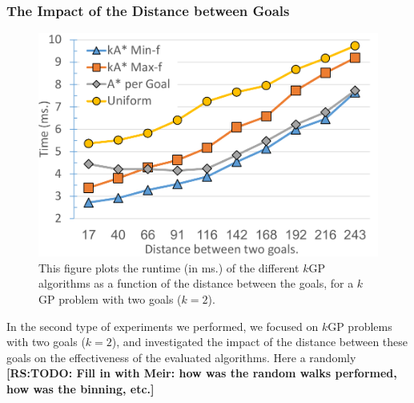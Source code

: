 \documentclass{aicom2e}
\newcommand{\kgs}{$k$GP}
\newcommand{\roni}[1]{\textbf{[RS:#1]}}
\begin{document}
\subsubsection{The Impact of the Distance between Goals}

\begin{figure}
    \includegraphics[width=\columnwidth]{G0-G1_cropped.pdf}
    \caption{This figure plots the runtime (in ms.) of the different \kgs{} algorithms as a function of the distance between the goals, for a \kgs{} problem with two goals ($k=2$).}
    \label{fig:2-goal}
\end{figure}
In the second type of experiments we performed, we focused on \kgs{} problems with two goals ($k=2$), and investigated the impact of the distance between these goals on the effectiveness of the evaluated algorithms. Here a randomly \roni{TODO: Fill in with Meir: how was the random walks performed, how was the binning, etc.}
\end{document}
